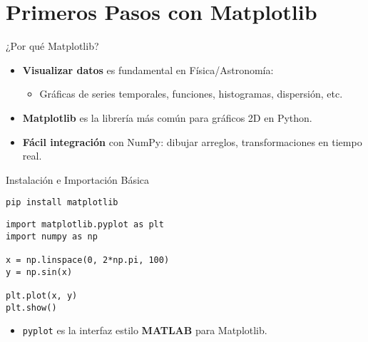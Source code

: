 \documentclass[10pt]{beamer}
\begin{document}
\section{Primeros Pasos con Matplotlib}

\begin{frame}{¿Por qué Matplotlib?}
  \begin{itemize}
    \item \textbf{Visualizar datos} es fundamental en Física/Astronomía:
      \begin{itemize}
        \item Gráficas de series temporales, funciones, histogramas, dispersión, etc.
      \end{itemize}
    \item \textbf{Matplotlib} es la librería más común para gráficos 2D en Python.
    \item \textbf{Fácil integración} con NumPy: dibujar arreglos, transformaciones en tiempo real.
  \end{itemize}
\end{frame}

\begin{frame}[fragile]{Instalación e Importación Básica}
\begin{verbatim}
pip install matplotlib
\end{verbatim}
\begin{verbatim}
import matplotlib.pyplot as plt
import numpy as np

x = np.linspace(0, 2*np.pi, 100)
y = np.sin(x)

plt.plot(x, y)
plt.show()
\end{verbatim}
\begin{itemize}
  \item \texttt{pyplot} es la interfaz estilo \textbf{MATLAB} para Matplotlib.
\end{itemize}
\end{frame}
\end{document}
